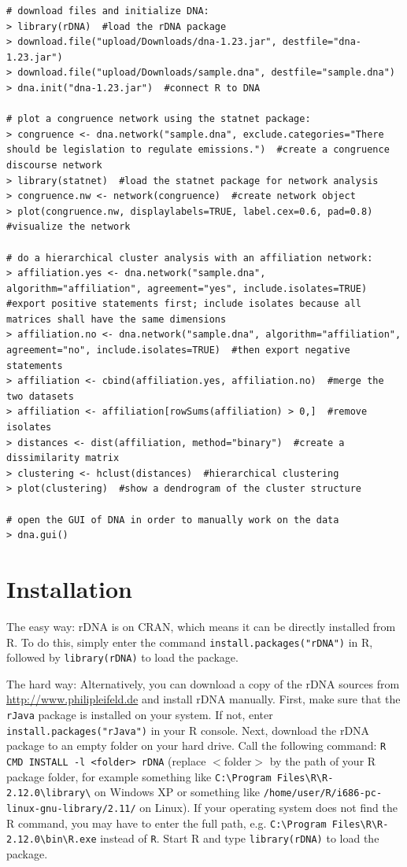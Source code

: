 \documentclass[12pt,a4paper]{scrreprt}
\newcommand{\code}[1]{\texttt{#1}}
\begin{document}
\begin{lstlisting}[breaklines=true,showstringspaces=false,frame=tlRB]
# download files and initialize DNA:
> library(rDNA)  #load the rDNA package
> download.file("upload/Downloads/dna-1.23.jar", destfile="dna-1.23.jar")
> download.file("upload/Downloads/sample.dna", destfile="sample.dna")
> dna.init("dna-1.23.jar")  #connect R to DNA

# plot a congruence network using the statnet package:
> congruence <- dna.network("sample.dna", exclude.categories="There should be legislation to regulate emissions.")  #create a congruence discourse network
> library(statnet)  #load the statnet package for network analysis
> congruence.nw <- network(congruence)  #create network object
> plot(congruence.nw, displaylabels=TRUE, label.cex=0.6, pad=0.8)  #visualize the network

# do a hierarchical cluster analysis with an affiliation network:
> affiliation.yes <- dna.network("sample.dna", algorithm="affiliation", agreement="yes", include.isolates=TRUE)  #export positive statements first; include isolates because all matrices shall have the same dimensions
> affiliation.no <- dna.network("sample.dna", algorithm="affiliation", agreement="no", include.isolates=TRUE)  #then export negative statements
> affiliation <- cbind(affiliation.yes, affiliation.no)  #merge the two datasets
> affiliation <- affiliation[rowSums(affiliation) > 0,]  #remove isolates
> distances <- dist(affiliation, method="binary")  #create a dissimilarity matrix
> clustering <- hclust(distances)  #hierarchical clustering
> plot(clustering)  #show a dendrogram of the cluster structure

# open the GUI of DNA in order to manually work on the data
> dna.gui()
\end{lstlisting}

\section{Installation}
The easy way: rDNA is on CRAN, which means it can be directly installed from R. To do this, simply enter the command \code{install.packages("rDNA")} in R, followed by \code{library(rDNA)} to load the package.

The hard way: Alternatively, you can download a copy of the rDNA sources from \url{http://www.philipleifeld.de} and install rDNA manually. First, make sure that the \code{rJava} package is installed on your system. If not, enter \code{install.packages("rJava")} in your R console. Next, download the rDNA package to an empty folder on your hard drive. Call the following command: \code{R CMD INSTALL -l <folder> rDNA} (replace $<$folder$>$ by the path of your R package folder, for example something like \code{C:\textbackslash Program Files\textbackslash R\textbackslash R-2.12.0\textbackslash library\textbackslash} on Windows XP or something like \code{/home/user/R/i686-pc-linux-gnu-library/2.11/} on Linux). If your operating system does not find the R command, you may have to enter the full path, e.g. \code{C:\textbackslash Program Files\textbackslash R\textbackslash R-2.12.0\textbackslash bin\textbackslash R.exe} instead of \code{R}. Start R and type \code{library(rDNA)} to load the package.
\end{document}
